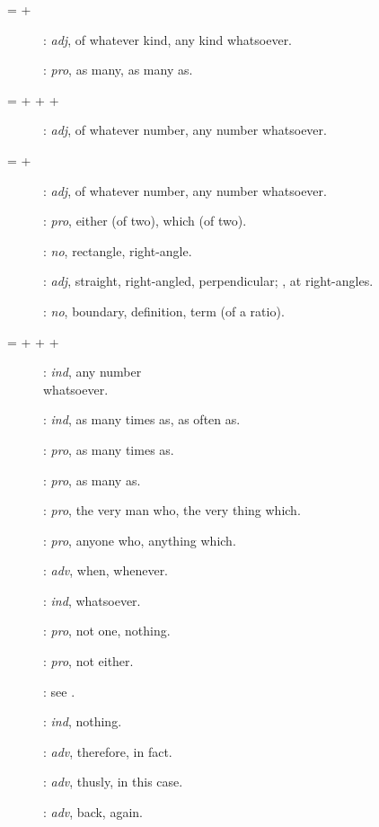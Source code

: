 {\begin{description}
\item [ =  + ]: {\em adj}, of whatever kind, any kind whatsoever.
\item[]: {\em pro}, as many, as many as.
\item[ =  +  +  + ]: {\em adj},
of whatever number, any number whatsoever.
\item[ =  + ]: {\em adj},
of whatever number, any number whatsoever.
\item[]: {\em pro}, either (of two), which (of two).
\item[]: {\em no}, rectangle, right-angle.
\item[]: {\em adj}, straight, right-angled, perpendicular; , at right-angles.
\item[]: {\em no}, boundary, definition, term (of a ratio).
\item[ =  +  +  + ]: {\em ind}, any number\\ whatsoever.
\item[]: {\em ind}, as many times as, as often as.
\item[]: {\em pro}, as many times as.
\item[]: {\em pro}, as many as.
\item[]: {\em pro}, the very man who, the very thing which.
\item[]: {\em pro}, anyone who, anything which.
\item[]:  {\em adv}, when, whenever.
\item[]: {\em ind}, whatsoever.
\item[]: {\em pro}, not one, nothing. 
\item[]: {\em pro}, not either.
\item[]: see .
\item[]: {\em ind}, nothing.
\item[]: {\em adv}, therefore, in fact.
\item[]: {\em adv}, thusly, in this case.
\item[]: {\em adv}, back, again.

\end{description}}
